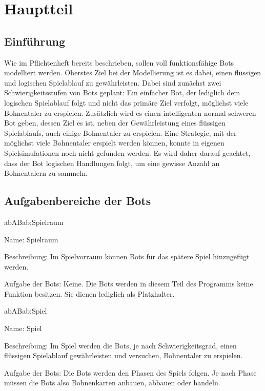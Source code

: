 \chapter{Hauptteil}

\section{Einführung}

Wie im Pflichtenheft bereits beschrieben, sollen voll funktionsfähige Bots modelliert werden. Oberstes Ziel bei der Modellierung ist es dabei, einen flüssigen und logischen Spielablauf zu gewährleisten. Dabei sind zunächst zwei Schwierigkeitsstufen von Bots geplant: Ein einfacher Bot, der lediglich dem logischen Spielablauf folgt und nicht das primäre Ziel verfolgt, möglichst viele Bohnentaler zu erspielen. Zusätzlich wird es einen intelligenten normal-schweren Bot geben, dessen Ziel es ist, neben der Gewährleistung eines flüssigen Spielablaufs, auch einige Bohnentaler zu erspielen. Eine Strategie, mit der möglichst viele Bohnentaler erspielt werden können, konnte in eigenen Spielsimulationen noch nicht gefunden werden. Es wird daher darauf geachtet, dass der Bot logischen Handlungen folgt, um eine gewisse Anzahl an Bohnentalern zu sammeln.

\section{Aufgabenbereiche der Bots}

\setcounter{ab}{10}

\begin{description}[leftmargin=5em, style=sameline]
	
	\begin{lhp}{ab}{AB}{ab:Spielraum}
		\item [Name:] Spielraum
		\item [Beschreibung:] Im Spielvorraum können Bots für das spätere Spiel hinzugefügt werden.
		\item [Aufgabe der Bots:] Keine. Die Bots werden in diesem Teil des Programms keine Funktion besitzen. Sie dienen lediglich als Platzhalter.
	\end{lhp}

	\begin{lhp}{ab}{AB}{ab:Spiel}
		\item [Name:] Spiel
		\item [Beschreibung:] Im Spiel werden die Bots, je nach Schwierigkeitsgrad, einen flüssigen Spielablauf gewährleisten und versuchen, Bohnentaler zu erspielen.
		\item [Aufgabe der Bots:] Die Bots werden den Phasen des Spiels folgen. Je nach Phase müssen die Bots also Bohnenkarten anbauen, abbauen oder handeln. 
	\end{lhp}
		

		
\end{description}

